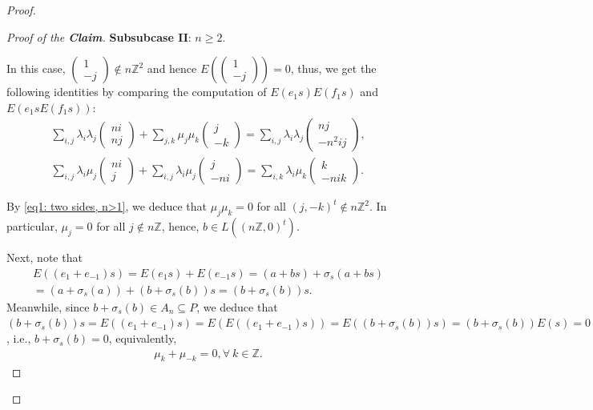 \documentclass[12pt]{amsart}
\theoremstyle{definition}
\theoremstyle{remark}
\begin{document}
\begin{proof}
\begin{proof}[Proof of the \textbf{Claim}]
\textbf{Subsubcase II}: $n\geq 2$.

In this case, $\begin{pmatrix}
1\\
-j
\end{pmatrix}\not\in n\mathbb{Z}^2$ and hence $ E(\begin{pmatrix}
1\\
-j
\end{pmatrix})=0$, thus, we get the following identities by comparing the computation of $E(e_1s)E(f_1s)$ and $E(e_1sE(f_1s))$:
\begin{align}
\label{eq1: two sides, n>1} \sum_{i, j}\lambda_i\lambda_j\begin{pmatrix}
ni\\
nj
\end{pmatrix}+\sum_{j, k}\mu_j\mu_k\begin{pmatrix}
j\\
-k
\end{pmatrix}=\sum_{i,j}\lambda_i\lambda_j\begin{pmatrix}
nj\\
-n^2ij
\end{pmatrix},\\
\label{eq2: two sides, n>1}\sum_{i,j}\lambda_i\mu_j\begin{pmatrix}
ni\\
j
\end{pmatrix}+\sum_{i, j}\lambda_i\mu_j\begin{pmatrix}
j\\
-ni
\end{pmatrix}=\sum_{i, k}\lambda_i\mu_k\begin{pmatrix}
k\\
-nik
\end{pmatrix}.
\end{align}

By \eqref{eq1: two sides, n>1}, we deduce that $\mu_j\mu_k=0$ for all $(j,-k)^t\not\in n\mathbb{Z}^2$. In particular, $\mu_j=0$ for all $j\not\in n\mathbb{Z}$, hence, $b\in L((n\mathbb{Z}, 0)^t)$.

Next, note that
\begin{align*}
E((e_1+e_{-1})s)=E(e_1s)+E(e_{-1}s)=(a+bs)+\sigma_s(a+bs)\\
=(a+\sigma_s(a))+(b+\sigma_s(b))s=(b+\sigma_s(b))s.
\end{align*}
Meanwhile, since $b+\sigma_s(b)\in A_n\subseteq P$, we deduce that $(b+\sigma_s(b))s=E((e_1+e_{-1})s)=E(E((e_1+e_{-1})s))=E((b+\sigma_s(b))s)=(b+\sigma_s(b))E(s)=0$, i.e., $b+\sigma_s(b)=0$, equivalently, 
\begin{align}\label{eq: skew-symmetry on coefficients of b}
\mu_k+\mu_{-k}=0, \forall ~k\in \mathbb{Z}.
\end{align}


\end{proof}
\end{proof}
\end{document}
